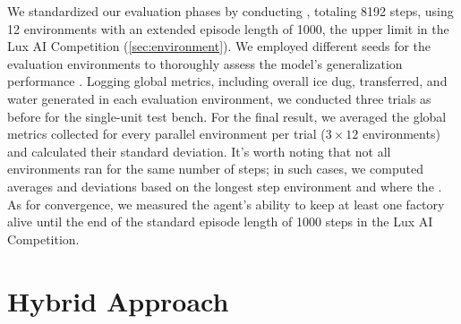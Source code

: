 \noindent We standardized our evaluation phases by conducting , totaling 8192 steps, using 12 environments with an extended episode length of 1000, the upper limit in the Lux AI Competition (\autoref{sec:environment}). We employed different seeds for the evaluation environments to thoroughly assess the model's generalization performance \protect \footnotemark. Logging global metrics, including overall ice dug, transferred, and water generated in each evaluation environment, we conducted three trials as before for the single-unit test bench. For the final result, we averaged the global metrics collected for every parallel environment per trial ($3\times12$ environments) and calculated their standard deviation. It's worth noting that not all environments ran for the same number of steps; in such cases, we computed averages and deviations based on the longest step environment and  where the . As for convergence, we measured the agent's ability to keep at least one factory alive until the end of the standard episode length of 1000 steps in the Lux AI Competition.


\section{Hybrid Approach}
\label{sec:hybrid-approach}

